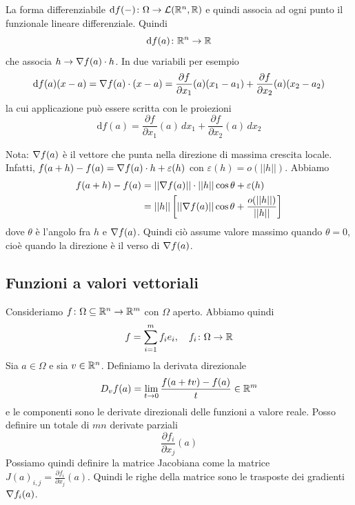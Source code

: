 \documentclass[a4paper]{article}
\begin{document}
\begin{radioactive}
La forma differenziabile \(\text{d}f(-) \colon \Omega \to \mathcal{L}(\mathbb{R}^n, \mathbb{R})\)
e quindi associa ad ogni punto il funzionale lineare differenziale.
Quindi
\[
    \text{d}f(a) \colon \mathbb{R}^n \to \mathbb{R}
\]
che associa \(h \to \nabla f(a) \cdot h\).
In due variabili per esempio
\[
    \text{d}f(a)(x-a) = \nabla f(a) \cdot (x-a)\\
    = \frac{\partial f}{\partial x_1}(a)(x_1-a_1) + \frac{\partial f}{\partial x_2}(a)(x_2-a_2)
\]
la cui applicazione può essere scritta con le proiezioni
\[
    \text{d}f(a) = \frac{\partial f}{\partial x_1}(a)\,dx_1 + \frac{\partial f}{\partial x_2}(a)\,dx_2
\]

Nota: \(\nabla f(a)\) è il vettore che punta nella direzione di massima crescita locale.
Infatti, \(f(a+h) - f(a) = \nabla f(a) \cdot h + \varepsilon(h)\)
con \(\varepsilon(h) = o(||h||)\).
Abbiamo
\begin{align*}
    f(a+h) - f(a) &= ||\nabla f(a)|| \cdot ||h|| \cos\theta + \varepsilon(h) \\
    &= ||h|| \left[
        ||\nabla f(a)|| \cos\theta + \frac{o(||h||)}{||h||}
    \right]
\end{align*}
dove \(\theta\) è l'angolo fra \(h\) e \(\nabla f(a)\).
Quindi ciò assume valore massimo quando \(\theta = 0\),
cioè quando la direzione è il verso di \(\nabla f(a)\).
\end{radioactive}


\pagebreak

\subsection{Funzioni a valori vettoriali}

\begin{radioactive}
Consideriamo \(f\colon \Omega \subseteq \mathbb{R}^n \to \mathbb{R}^m\) con \(\Omega\)
aperto. Abbiamo quindi
\[
    f = \sum_{i=1}^m f_i e_i, \quad f_i \colon \Omega \to \mathbb{R}
\]
Sia \(a\in \Omega\) e sia \(v \in \mathbb{R}^n\). Definiamo la derivata direzionale
\[
    D_v f(a) = \lim_{t\to 0} \frac{
        f(a+tv) - f(a)
    }{t} \in \mathbb{R}^m
\]
e le componenti sono le derivate direzionali delle funzioni a valore reale.
Posso definire un totale di \(mn\) derivate parziali
\[
    \frac{\partial f_i}{\partial x_j} (a)
\]
Possiamo quindi definire la matrice Jacobiana come la matrice
\(J(a)_{i,j} = \frac{\partial f_i}{\partial x_j} (a)\).
Quindi le righe della matrice sono le trasposte dei gradienti \(\nabla f_i(a)\).
\end{radioactive}
\end{document}
